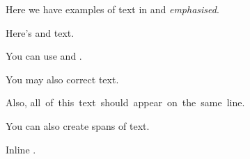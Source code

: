 Here we have examples of text in  and \emph{emphasised}.

Here's  and  text.

You can use  and .

You may also correct  text.

Also, \mbox{all of this text should appear on the same line.}

You can also create  spans of text.

Inline .

